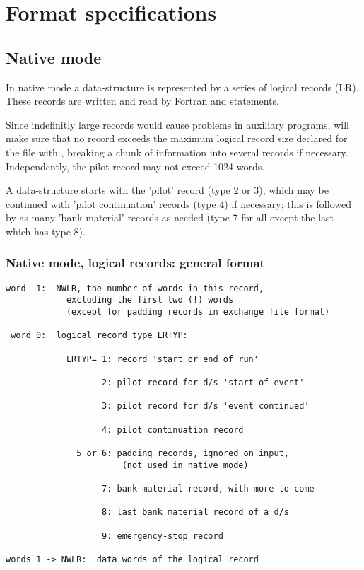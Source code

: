 \chapter{Format specifications}

\section{Native mode}

In native mode
a data-structure is represented by a series of logical records (LR).
These records are written and read by Fortran  and 
statements.

Since indefinitly large records would cause problems in
auxiliary programs,
 will make sure that no record exceeds the maximum
logical record size declared for the file with ,
breaking a chunk of information into several records if necessary.
Independently, the pilot record may not exceed 1024 words.

A data-structure starts with the 'pilot' record (type 2 or 3),
%
which may be continued with 'pilot continuation' records (type 4)
%
if necessary; this is followed by as many 'bank material' records
%
as needed (type 7 for all except the last which has type 8).

\subsection*{Native mode, logical records: general format}

\begin{verbatim}
word -1:  NWLR, the number of words in this record,
            excluding the first two (!) words
            (except for padding records in exchange file format)

 word 0:  logical record type LRTYP:

            LRTYP= 1: record 'start or end of run'

                   2: pilot record for d/s 'start of event'

                   3: pilot record for d/s 'event continued'

                   4: pilot continuation record

              5 or 6: padding records, ignored on input,
                       (not used in native mode)

                   7: bank material record, with more to come

                   8: last bank material record of a d/s

                   9: emergency-stop record

words 1 -> NWLR:  data words of the logical record
\end{verbatim}

